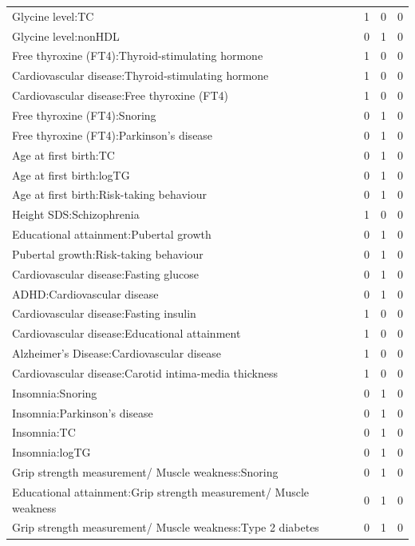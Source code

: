 \begin{table}[ht]
\begin{tabular}{lrrr}
  Glycine level:TC &   1 &   0 &   0 \\ 
  Glycine level:nonHDL &   0 &   1 &   0 \\ 
  Free thyroxine (FT4):Thyroid-stimulating hormone &   1 &   0 &   0 \\ 
  Cardiovascular disease:Thyroid-stimulating hormone &   1 &   0 &   0 \\ 
  Cardiovascular disease:Free thyroxine (FT4) &   1 &   0 &   0 \\ 
  Free thyroxine (FT4):Snoring &   0 &   1 &   0 \\ 
  Free thyroxine (FT4):Parkinson's disease &   0 &   1 &   0 \\ 
  Age at first birth:TC &   0 &   1 &   0 \\ 
  Age at first birth:logTG &   0 &   1 &   0 \\ 
  Age at first birth:Risk-taking behaviour &   0 &   1 &   0 \\ 
  Height SDS:Schizophrenia &   1 &   0 &   0 \\ 
  Educational attainment:Pubertal growth &   0 &   1 &   0 \\ 
  Pubertal growth:Risk-taking behaviour &   0 &   1 &   0 \\ 
  Cardiovascular disease:Fasting glucose &   0 &   1 &   0 \\ 
  ADHD:Cardiovascular disease &   0 &   1 &   0 \\ 
  Cardiovascular disease:Fasting insulin &   1 &   0 &   0 \\ 
  Cardiovascular disease:Educational attainment &   1 &   0 &   0 \\ 
  Alzheimer's Disease:Cardiovascular disease &   1 &   0 &   0 \\ 
  Cardiovascular disease:Carotid intima-media thickness &   1 &   0 &   0 \\ 
  Insomnia:Snoring &   0 &   1 &   0 \\ 
  Insomnia:Parkinson's disease &   0 &   1 &   0 \\ 
  Insomnia:TC &   0 &   1 &   0 \\ 
  Insomnia:logTG &   0 &   1 &   0 \\ 
  Grip strength measurement/ Muscle weakness:Snoring &   0 &   1 &   0 \\ 
  Educational attainment:Grip strength measurement/ Muscle weakness &   0 &   1 &   0 \\ 
  Grip strength measurement/ Muscle weakness:Type 2 diabetes &   0 &   1 &   0 \\ 

\end{tabular}
\end{table}
